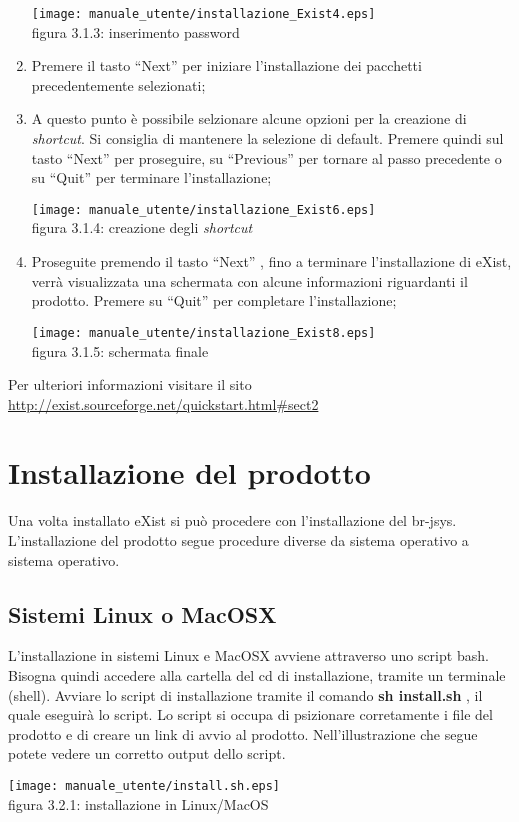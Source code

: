 \begin{enumerate}
\begin{center}
\texttt{[image: manuale\_utente/installazione\_Exist4.eps]}\\
 figura 3.1.3: inserimento password
\end{center}
\item Premere il tasto ``Next'' per iniziare l'installazione dei pacchetti precedentemente selezionati;
\item A questo punto \`e possibile selzionare alcune opzioni per la creazione di \textit{shortcut}. Si consiglia di mantenere la selezione di default. Premere quindi sul tasto ``Next'' per proseguire, su ``Previous'' per tornare al passo precedente o su ``Quit'' per terminare l'installazione;
\begin{center}
\texttt{[image: manuale\_utente/installazione\_Exist6.eps]}\\
 figura 3.1.4: creazione degli \textit{shortcut}
\end{center}
\item Proseguite premendo il tasto ``Next'' , fino a terminare l'installazione di eXist, verr\`a visualizzata una schermata con alcune informazioni riguardanti il prodotto. Premere su ``Quit'' per completare l'installazione;
\begin{center}
\texttt{[image: manuale\_utente/installazione\_Exist8.eps]}\\
 figura 3.1.5: schermata finale
\end{center}
\end{enumerate}
Per ulteriori informazioni visitare il sito\\
 \href{http://exist.sourceforge.net/quickstart.html\#sect2}{ http://exist.sourceforge.net/quickstart.html\#sect2}

\section{Installazione del prodotto}
Una volta installato eXist si pu\`o procedere con l'installazione del br-jsys.
L'installazione del prodotto segue procedure diverse da sistema operativo a sistema operativo.

\subsection{Sistemi Linux o MacOSX}
L'installazione in sistemi Linux e MacOSX avviene attraverso uno script bash. Bisogna quindi  accedere alla cartella del cd di installazione,  tramite un terminale (shell). Avviare lo script di installazione tramite il comando \textbf{sh install.sh} , il quale eseguir\`a lo script.
Lo script si occupa di psizionare corretamente i file del prodotto e di creare un link di avvio al prodotto.
Nell'illustrazione che segue potete vedere un corretto output dello script.\\
\begin{center}
\texttt{[image: manuale\_utente/install.sh.eps]}\\
 figura 3.2.1: installazione in Linux/MacOS
\end{center}

